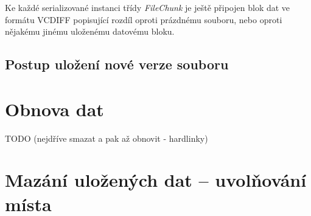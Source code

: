 Ke každé serializované instanci třídy {\it FileChunk} je ještě připojen blok
dat ve formátu \gls{VCDIFF} popisující rozdíl oproti prázdnému souboru, nebo
oproti nějakému jinému uloženému datovému bloku.

\subsection{Postup uložení nové verze souboru}

\section{Obnova dat}

TODO (nejdříve smazat a pak až obnovit - hardlinky)

\section{Mazání uložených dat -- uvolňování místa}
